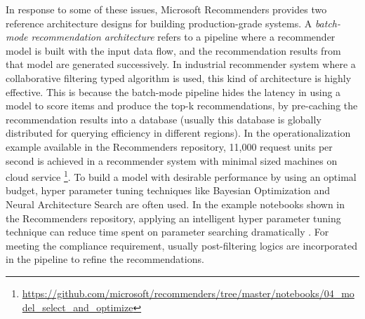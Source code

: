 %
In response to some of these issues, 
Microsoft Recommenders provides two reference architecture designs for building production-grade systems. 
A \textit{batch-mode recommendation architecture} refers to a pipeline where a recommender model is built with the input data flow, and the recommendation results from that model are generated successively. In industrial recommender system where a collaborative filtering typed algorithm is used, this kind of architecture is highly effective. This is because the batch-mode pipeline hides the latency in using a model to score items and produce the top-k recommendations, by pre-caching the recommendation results into a database (usually this database is globally distributed for querying efficiency in different regions). In the operationalization example available in the Recommenders repository, 11,000 request units per second is achieved in a recommender system with minimal sized machines on cloud service \footnote{\url{https://github.com/microsoft/recommenders/tree/master/notebooks/04_model_select_and_optimize}}\label{model_select}. 
To build a model with desirable performance by using an optimal budget, hyper parameter tuning techniques like Bayesian Optimization \cite{snoek2012practical} and Neural Architecture Search \cite{zoph2016neural} are often used. In the example notebooks shown in the Recommenders repository, applying an intelligent hyper parameter tuning technique can reduce time spent on parameter searching dramatically . For meeting the compliance requirement, usually post-filtering logics are incorporated in the pipeline to refine the recommendations.

